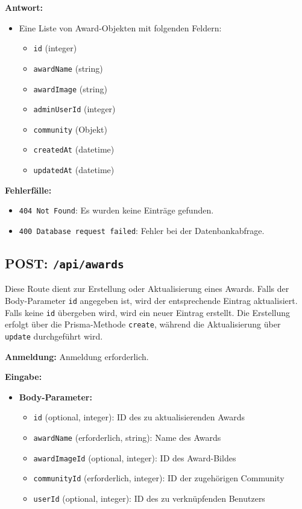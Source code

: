 \documentclass[a4paper,12pt]{article}
\begin{document}
\textbf{Antwort:}
\begin{itemize}
    \item Eine Liste von Award-Objekten mit folgenden Feldern:
    \begin{itemize}
        \item \texttt{id} (integer)
        \item \texttt{awardName} (string)
        \item \texttt{awardImage} (string)
        \item \texttt{adminUserId} (integer)
        \item \texttt{community} (Objekt)
        \item \texttt{createdAt} (datetime)
        \item \texttt{updatedAt} (datetime)
    \end{itemize}
\end{itemize}

\textbf{Fehlerfälle:}
\begin{itemize}
    \item \texttt{404 Not Found}: Es wurden keine Einträge gefunden.
    \item \texttt{400 Database request failed}: Fehler bei der Datenbankabfrage.
\end{itemize}

\subsection{POST: \texttt{/api/awards}}

Diese Route dient zur Erstellung oder Aktualisierung eines Awards. Falls der Body-Parameter \texttt{id} angegeben ist, wird der entsprechende Eintrag aktualisiert. Falls keine \texttt{id} übergeben wird, wird ein neuer Eintrag erstellt. Die Erstellung erfolgt über die Prisma-Methode \texttt{create}, während die Aktualisierung über \texttt{update} durchgeführt wird.

\textbf{Anmeldung:} Anmeldung erforderlich.

\textbf{Eingabe:}
\begin{itemize}
    \item \textbf{Body-Parameter:}
    \begin{itemize}
        \item \texttt{id} (optional, integer): ID des zu aktualisierenden Awards
        \item \texttt{awardName} (erforderlich, string): Name des Awards
        \item \texttt{awardImageId} (optional, integer): ID des Award-Bildes
        \item \texttt{communityId} (erforderlich, integer): ID der zugehörigen Community
        \item \texttt{userId} (optional, integer): ID des zu verknüpfenden Benutzers
    \end{itemize}
\end{itemize}
\end{document}
